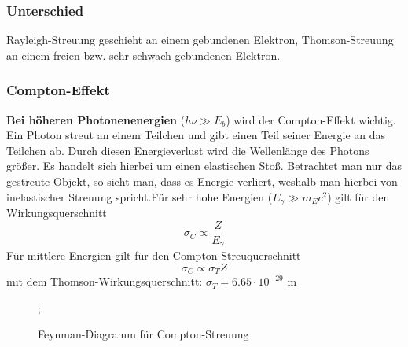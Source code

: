 \documentclass[Ex4_Zusammenfassung.tex]{subfiles}
\begin{document}
\subsubsection*{Unterschied} 
Rayleigh-Streuung geschieht an einem gebundenen Elektron, Thomson-Streuung an einem freien bzw. sehr schwach gebundenen Elektron.

\subsubsection*{Compton-Effekt}
\textbf{Bei höheren Photonenenergien} ($ h \nu \gg E_b$) wird der Compton-Effekt wichtig. Ein Photon streut an einem Teilchen und gibt einen Teil seiner Energie an das Teilchen ab. Durch diesen Energieverlust wird die Wellenlänge des Photons größer.\newline
Es handelt sich hierbei um einen elastischen Stoß. Betrachtet man nur das gestreute Objekt, so sieht man, dass es Energie verliert, weshalb man hierbei von inelastischer Streuung spricht.Für sehr hohe Energien ($E_{\gamma} \gg m_E c^2$) gilt für den Wirkungsquerschnitt
\begin{equation}
\sigma_{C} \propto \frac{Z}{E_{\gamma}}
\end{equation}
Für mittlere Energien gilt für den Compton-Streuquerschnitt
\begin{equation}
\sigma_{C} \propto \sigma_{T} Z 
\end{equation}
mit dem Thomson-Wirkungsquerschnitt: $\sigma_{T} = 6.65 \cdot 10^{-29} $ m 

\begin{figure}[H]
	\centering
					;
		\caption{Feynman-Diagramm für Compton-Streuung}
	\end{figure}
	
\end{document}
